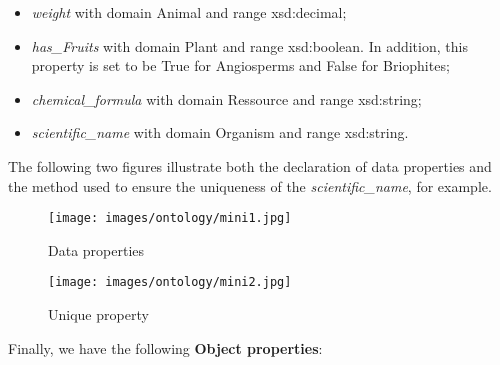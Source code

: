     \begin{itemize}
        \item \textit{weight} with domain Animal and range xsd:decimal;

        \item \textit{has\_Fruits} with domain Plant and range xsd:boolean. In addition, this property is set to be True for Angiosperms and False for Briophites;

        \item \textit{chemical\_formula} with domain Ressource and range xsd:string;

        \item \textit{scientific\_name} with domain Organism and range xsd:string.
        \\

    \end{itemize}


The following two figures illustrate both the declaration of data properties and the method used to ensure the uniqueness of the \textit{scientific\_name}, for example.
\\

\begin{figure}[H]
    \centering
    \begin{minipage}{0.35\textwidth}
        \centering
        \texttt{[image: images/ontology/mini1.jpg]}
        \caption{Data properties}
        \label{fig:figura1}
    \end{minipage}%
    \hspace{0.1\textwidth}
    \begin{minipage}{0.35\textwidth}
        \centering
        \texttt{[image: images/ontology/mini2.jpg]}
        \caption{Unique property}
        \label{fig:figura2}
    \end{minipage}
\end{figure}

Finally, we have the following \textbf{Object properties}:
\\

